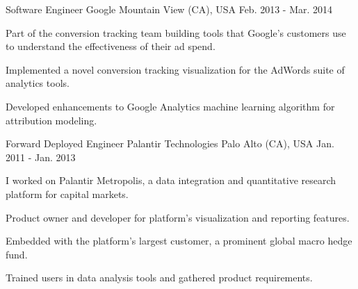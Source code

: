 \begin{cventries}
  \cventry
    {Software Engineer} %
    {Google} %
    {Mountain View (CA), USA} %
    {Feb. 2013 - Mar. 2014} %
    {
      Part of the conversion tracking team building tools that Google's customers use to understand the effectiveness of their ad spend.
      \vspace{5.0mm}
      \begin{cvitems} %
        \item {Implemented a novel conversion tracking visualization for the AdWords suite of analytics tools.}
        \item {Developed enhancements to Google Analytics machine learning algorithm for attribution modeling.}
      \end{cvitems}
    }

  \cventry
    {Forward Deployed Engineer} %
    {Palantir Technologies} %
    {Palo Alto (CA), USA} %
    {Jan. 2011 - Jan. 2013} %
    {
      I worked on Palantir Metropolis, a data integration and quantitative research platform for capital markets.
      \vspace{5.0mm}
      \begin{cvitems} %
        \item {Product owner and developer for platform's visualization and reporting features.}
        \item {Embedded with the platform's largest customer, a prominent global macro hedge fund.}
        \item {Trained users in data analysis tools and gathered product requirements.}
      \end{cvitems}
    }

\end{cventries}
